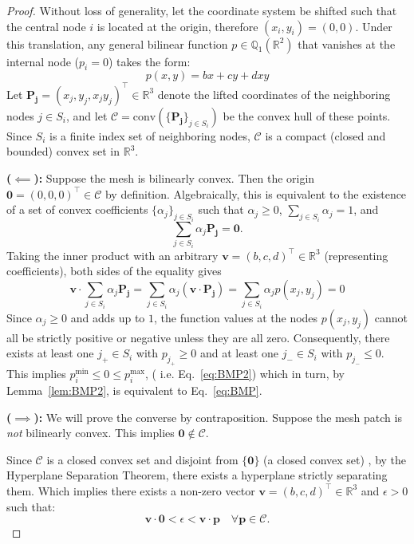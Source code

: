 \documentclass[10pt,a4paper]{amsart}
\begin{document}
\begin{proof}
Without loss of generality, let the coordinate system be shifted such that the central node $i$ is located at the origin, therefore $(x_i, y_i) = (0,0)$. Under this translation, any general bilinear function $p \in \mathbb{Q}_1(\mathbb{R}^2)$ that vanishes at the internal node ($p_i = 0$) takes the form:
$$
p(x,y) = bx + cy + dxy
$$
Let $ \mathbf{P_j} = (x_j, y_j, x_j y_j)^\top \in \mathbb{R}^3$ denote the lifted coordinates of the neighboring nodes $j \in S_i$, and let $\mathcal{C} = \text{conv}(\{\mathbf{P_j}\}_{j \in S_i})$ be the convex hull of these points. Since $S_i$ is a finite index set of neighboring nodes, $\mathcal{C}$ is a compact (closed and bounded) convex set in $\mathbb{R}^3$.

\textbf{($\impliedby$):} 
Suppose the mesh is bilinearly convex. Then the origin $\mathbf{0} = (0,0,0)^\top \in \mathcal{C}$ by definition. Algebraically, this is equivalent to the existence of a set of convex coefficients $\{\alpha_j\}_{j \in S_i}$ such that $\alpha_j \geq 0$, $\sum_{j \in S_i} \alpha_j = 1$, and
$$
\sum_{j \in S_i} \alpha_j \mathbf{P_j} = \mathbf{0}.
$$
Taking the inner product with an arbitrary $\mathbf{v} = (b,c,d)^\top \in \mathbb{R}^3$ (representing coefficients), both sides of the equality gives
$$
\mathbf{v} \cdot \sum_{j \in S_i} \alpha_j \mathbf{P_j} = \sum_{j \in S_i} \alpha_j (\mathbf{v} \cdot \mathbf{P_j}) = \sum_{j \in S_i} \alpha_j p(x_j, y_j) = 0
$$
	Since $\alpha_j \geq 0$ and adds up to $1$, the function values at the nodes $p(x_j, y_j)$ cannot all be strictly positive or negative unless they are all zero. Consequently, there exists at least one $j_+ \in S_i$ with  $p_{j_+}\geq 0$ and at least one $j_- \in S_i$ with  $p_{j_-}\leq 0$. This implies $p_i^{\min} \leq 0 \leq p_i^{\max}$, ( i.e. Eq.~\eqref{eq:BMP2}) which in turn, by Lemma~\ref{lem:BMP2},  is equivalent to Eq.~\eqref{eq:BMP}.
	
\textbf{ ($\implies$):} 
We will prove the converse by contraposition. Suppose the mesh patch is \textit{not} bilinearly convex. This implies  $\mathbf{0} \notin \mathcal{C}$.
	
Since $\mathcal{C}$ is a closed convex set and disjoint from  $\{\mathbf{0}\}$ (a closed convex set) , by the Hyperplane Separation Theorem, there exists a hyperplane strictly separating them. Which implies there exists a non-zero vector $\mathbf{v} = (b, c, d)^\top \in \mathbb{R}^3$ and $\epsilon > 0$ such that:
$$
\mathbf{v} \cdot \mathbf{0} < \epsilon < \mathbf{v} \cdot \mathbf{p} \quad \forall \mathbf{p} \in \mathcal{C}.
$$


\end{proof}
\end{document}
